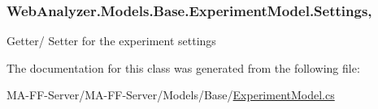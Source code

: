 \subsubsection[{Settings}]{ Web\+Analyzer.\+Models.\+Base.\+Experiment\+Model.\+Settings\hspace{0.3cm}{\ttfamily [get]}, {\ttfamily [set]}}\label{class_web_analyzer_1_1_models_1_1_base_1_1_experiment_model_a00e6e2b80147ab73fc0eee0e7c20d856}


Getter/ Setter for the experiment settings 



The documentation for this class was generated from the following file\+:\begin{DoxyCompactItemize}
\item 
M\+A-\/\+F\+F-\/\+Server/\+M\+A-\/\+F\+F-\/\+Server/\+Models/\+Base/\hyperlink{_experiment_model_8cs}{Experiment\+Model.\+cs}\end{DoxyCompactItemize}
